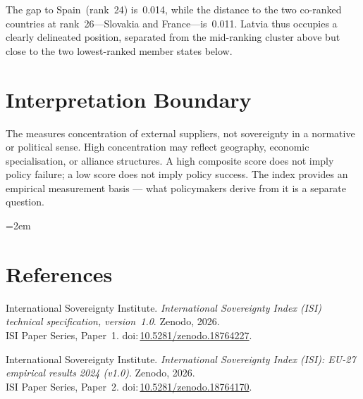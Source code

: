 \documentclass[12pt,a4paper]{article}
\begin{document}
The gap to Spain~(rank~24) is~0.014, while the distance to the two co-ranked countries at rank~26---Slovakia and France---is~0.011.  Latvia thus occupies a clearly delineated position, separated from the mid-ranking cluster above but close to the two lowest-ranked member states below.


\section{Interpretation Boundary}
\label{sec:interpretation}

The \ISI measures concentration of external suppliers, not sovereignty in a normative or political sense.  High concentration may reflect geography, economic specialisation, or alliance structures.  A high composite score does not imply policy failure; a low score does not imply policy success.  The index provides an empirical measurement basis --- what policymakers derive from it is a separate question.


\clearpage
\vspace*{1.5cm}

\begingroup\emergencystretch=2em
\section*{References}

\begin{enumerate}[label={[\arabic*]},leftmargin=2em,itemsep=6pt]
\item International Sovereignty Institute.
  \textit{International Sovereignty Index (ISI) technical specification, version~1.0}.
  Zenodo, 2026.\\ISI Paper Series, Paper~1.
  doi:\,\href{https://doi.org/10.5281/zenodo.18764227}{10.5281/zenodo.18764227}.

\item International Sovereignty Institute.
  \textit{International Sovereignty Index (ISI): EU-27 empirical results 2024 (v1.0)}.
  Zenodo, 2026.\\ISI Paper Series, Paper~2.
  doi:\,\href{https://doi.org/10.5281/zenodo.18764170}{10.5281/zenodo.18764170}.
\end{enumerate}
\endgroup
\end{document}
